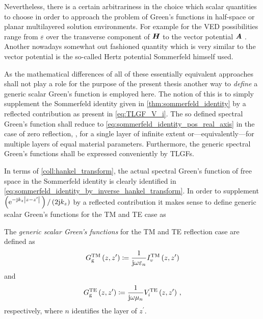 Nevertheless, there is a certain arbitrariness in the choice which scalar
quantities to choose in order to approach the problem of Green's functions 
in half-space or planar multilayered solution environments.
For example for the \ac{VED} possibilities range from $\varepsilon \tilde{}$
over the transverse component of $\pvec{H}$ to the vector potential $\pvec{A}$
\cite{Michalski2016b}.
Another nowadays somewhat out fashioned quantity which is very similar to the
vector potential is the so-called Hertz potential Sommerfeld himself used.

As the mathematical differences of all of these essentially equivalent
approaches shall not play a role for the purpose of the present thesis another
way to \emph{define} a generic scalar Green's function is employed here.
The notion of this is to simply supplement the Sommerfeld identity given in
\cref{thm:sommerfeld_identity} by a reflected contribution as present in 
\eqref{eq:TLGF_V_i}.
The so defined spectral Green's function shall reduce to
\eqref{eq:sommerfeld_identity_pos_real_axis} in the case of zero reflection, 
\ie, for a single layer of infinite extent or---equivalently---for multiple
layers of equal material parameters.
Furthermore, the generic spectral Green's functions shall be expressed
conveniently by \acp{TLGF}.

In terms of \cref{coll:hankel_transform}, the actual spectral Green's function
of free space in the Sommerfeld identity is clearly identified in
\eqref{eq:sommerfeld_identity_by_inverse_hankel_transform}.
In order to supplement
$\left(\mathrm{e}^{-\mathrm{j} k_z \left\vert z - z^\prime\right\vert}\,\right) / \left(2 \mathrm{j} k_z\right)$
by a reflected contribution it makes sense to define generic scalar Green's
functions for the \ac{TM} and \ac{TE} case as
\begin{definition}
	\label{def:generic_scalar_gf}
	The \emph{generic scalar Green's functions} for the \ac{TM} and \ac{TE}
	reflection case are defined as 
	\begin{equation}\label{eq:def_generic_sgf_tm}
		G_{\mathrm{g}}^{\mathrm{TM}}
		\left(z, z^\prime\right)
		\coloneqq	
		\frac{1}{\mathrm{j} \omega \varepsilon_n}
		I_v^{\mathrm{TM}}
		\left(z, z^\prime\right)
	\end{equation}
	and
	\begin{equation}\label{eq:def_generic_sgf_te}
		G_{\mathrm{g}}^{\mathrm{TE}}
		\left(z, z^\prime\right)
		\coloneqq	
		\frac{1}{\mathrm{j} \omega \mu_n}
		V_i^{\mathrm{TE}}
		\left(z, z^\prime\right)
		\, ,
	\end{equation}
	respectively, where $n$ identifies the layer of $z^\prime$.
\end{definition}

